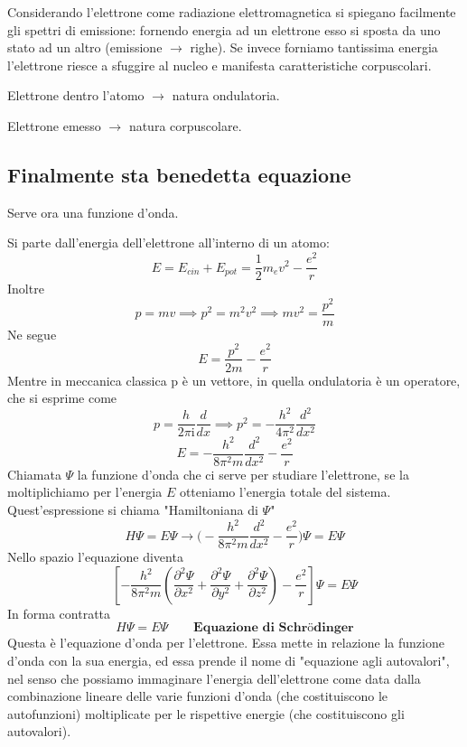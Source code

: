 Considerando l'elettrone come radiazione elettromagnetica si spiegano facilmente gli spettri di emissione: fornendo energia ad un elettrone esso si sposta da uno stato ad un altro (emissione $\rightarrow$ righe). Se invece forniamo tantissima energia l'elettrone riesce a sfuggire al nucleo e manifesta caratteristiche corpuscolari.

\vspace{0.2cm}Elettrone dentro l'atomo $\rightarrow$ natura ondulatoria.

\vspace{0.2cm}Elettrone emesso $\rightarrow$ natura corpuscolare.
\subsection{Finalmente sta benedetta equazione}
Serve ora una funzione d'onda.

Si parte dall'energia dell'elettrone all'interno di un atomo:
$$E=E_{cin} + E_{pot}=\frac{1}{2}m_ev^2 - \frac{e^2}{r}$$
Inoltre
$$p=mv \implies p^2=m^2v^2 \implies mv^2=\frac{p^2}{m}$$
Ne segue
$$E=\frac{p^2}{2m} - \frac{e^2}{r}$$
Mentre in meccanica classica p è un vettore, in quella ondulatoria è un operatore, che si esprime come
$$p=\frac{h}{2\pi \text{i}}\frac{d}{dx}\implies p^2=-\frac{h^2}{4\pi^2}\frac{d^2}{dx^2}$$
$$E=-\frac{h^2}{8\pi^2m}\frac{d^2}{dx^2} -\frac{e^2}{r}$$
Chiamata $\Psi$ la funzione d'onda che ci serve per studiare l'elettrone, se la moltiplichiamo per l'energia $E$ otteniamo l'energia totale del sistema. Quest'espressione si chiama "Hamiltoniana di $\Psi$"
$$H\Psi=E\Psi \rightarrow \biggl(-\frac{h^2}{8\pi^2m}\frac{d^2}{dx^2} -\frac{e^2}{r}\biggr)\Psi=E\Psi$$
Nello spazio l'equazione diventa
$$\left[-\frac{h^2}{8\pi^2m}\left( \frac{\partial^2\Psi}{\partial x^2}+\frac{\partial^2\Psi}{\partial y^2}+\frac{\partial^2\Psi}{\partial z^2}\right) -\frac{e^2}{r}\right]\Psi =E\Psi$$
In forma contratta
$$H\Psi=E\Psi \qquad \textbf{Equazione di Schrödinger}$$
Questa è l'equazione d'onda per l'elettrone. Essa mette in relazione la funzione d'onda con la sua energia, ed essa prende il nome di "equazione agli autovalori", nel senso che possiamo immaginare l'energia dell'elettrone come data dalla combinazione lineare delle varie funzioni d'onda (che costituiscono le autofunzioni) moltiplicate per le rispettive energie (che costituiscono gli autovalori).

